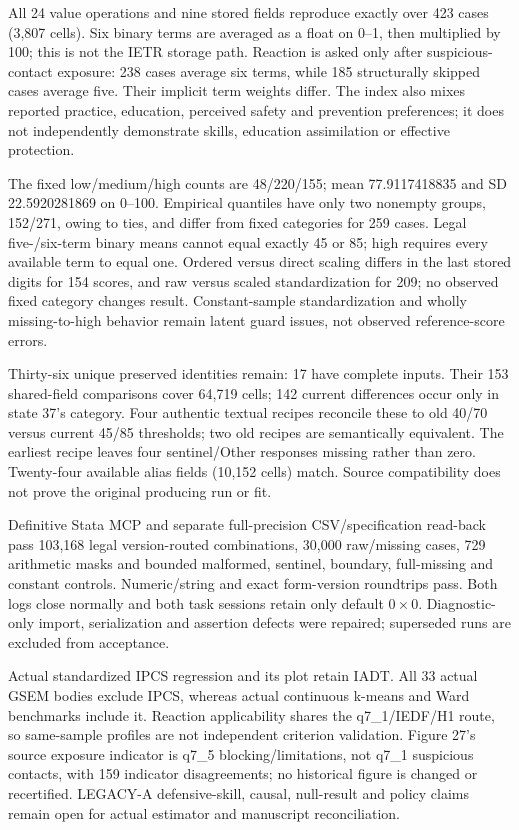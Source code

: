 \documentclass[11pt,a4paper]{article}
\begin{document}
All 24 value operations and nine stored fields reproduce exactly over
423 cases (3,807 cells). Six binary terms are averaged as a float on 0--1,
then multiplied by 100; this is not the IETR storage path.
Reaction is asked only after suspicious-contact exposure: 238 cases average
six terms, while 185 structurally skipped cases average five. Their implicit
term weights differ. The index also mixes reported practice, education,
perceived safety and prevention preferences; it does not independently
demonstrate skills, education assimilation or effective protection.

The fixed low/medium/high counts are 48/220/155; mean 77.9117418835 and
SD 22.5920281869 on 0--100. Empirical quantiles have only two nonempty
groups, 152/271, owing to ties, and differ from fixed categories for
259 cases. Legal five-/six-term binary means cannot equal exactly 45 or 85;
high requires every available term to equal one.
Ordered versus direct scaling differs in the last stored digits for 154
scores, and raw versus scaled standardization for 209; no observed fixed
category changes result. Constant-sample standardization and wholly
missing-to-high behavior remain latent guard issues, not observed
reference-score errors.

Thirty-six unique preserved identities remain: 17 have complete inputs.
Their 153 shared-field comparisons cover 64,719 cells; 142 current
differences occur only in state 37's category. Four authentic textual
recipes reconcile these to old 40/70 versus current 45/85 thresholds;
two old recipes are semantically equivalent. The earliest recipe leaves
four sentinel/Other responses missing rather than zero.
Twenty-four available alias fields (10,152 cells) match.
Source compatibility does not prove the original producing run or fit.

Definitive Stata MCP and separate full-precision CSV/specification read-back
pass 103,168 legal version-routed combinations, 30,000 raw/missing cases,
729 arithmetic masks and bounded malformed, sentinel, boundary, full-missing
and constant controls. Numeric/string and exact form-version roundtrips
pass. Both logs close normally and both task sessions retain only default
$0\times0$. Diagnostic-only import, serialization and assertion defects
were repaired; superseded runs are excluded from acceptance.

Actual standardized IPCS regression and its plot retain IADT.
All 33 actual GSEM bodies exclude IPCS, whereas actual continuous
k-means and Ward benchmarks include it.
Reaction applicability shares the q7\_1/IEDF/H1 route, so same-sample
profiles are not independent criterion validation.
Figure 27's source exposure indicator is q7\_5 blocking/limitations,
not q7\_1 suspicious contacts, with 159 indicator disagreements;
no historical figure is changed or recertified.
LEGACY-A defensive-skill, causal, null-result and policy claims remain open
for actual estimator and manuscript reconciliation.
\end{document}

